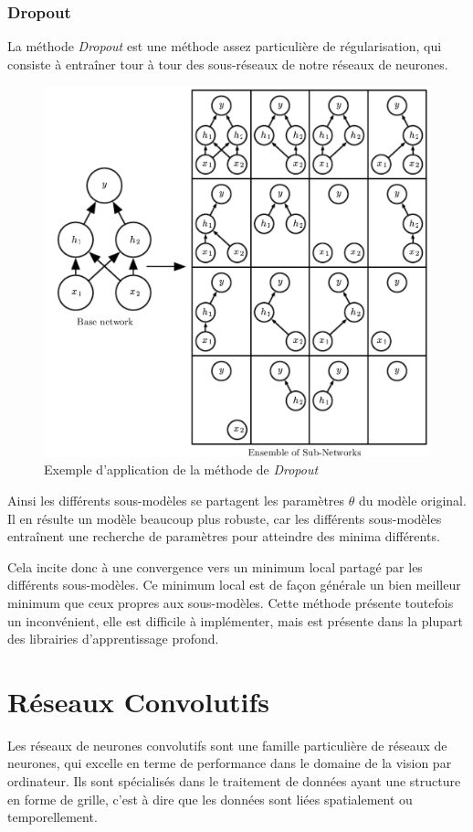\documentclass[a4paper, 10pt]{report}
\begin{document}
\subsubsection{Dropout}
La méthode \emph{Dropout} est une méthode assez particulière de régularisation, qui consiste à entraîner tour à tour des sous-réseaux de notre réseaux de neurones.
\begin{figure}[H]
	\begin{center}
		\includegraphics[scale=0.20]{Images/Dropout.png}
		\caption{Exemple d'application de la méthode de \emph{Dropout}}
	\end{center}
\end{figure}
Ainsi les différents sous-modèles se partagent les paramètres $\theta$ du modèle original.
Il en résulte un modèle beaucoup plus robuste, car les différents sous-modèles entraînent une recherche de paramètres pour atteindre des minima différents.

Cela incite donc à une convergence vers un minimum local partagé par les différents sous-modèles.
Ce minimum local est de façon générale un bien meilleur minimum que ceux propres aux sous-modèles.
Cette méthode présente toutefois un inconvénient, elle est difficile à implémenter, mais est présente dans la plupart des librairies d'apprentissage profond.
\section{Réseaux Convolutifs}
Les réseaux de neurones convolutifs sont une famille particulière de réseaux de neurones, qui excelle en terme de performance dans le domaine de la vision par ordinateur.
Ils sont spécialisés dans le traitement de données ayant une structure en forme de grille, c'est à dire que les données sont liées spatialement ou temporellement.
\end{document}
